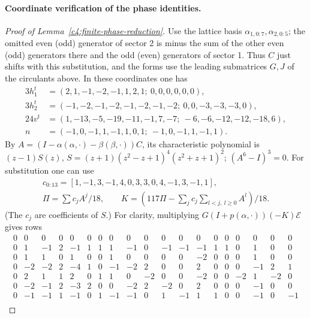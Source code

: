 \paragraph{Coordinate verification of the phase identities.}
\begin{proof}[Proof of Lemma~\ref{c4:finite-phase-reduction}]
Use the lattice basis \(\alpha_{1,0:7},\alpha_{2,0:5}\); the omitted even (odd) generator of sector 2 is minus the sum of the other even (odd) generators there and the odd (even) generators of sector 1. Thus \(C\) just shifts with this substitution, and the forms use the leading submatrices \(G,J\) of the circulants above. In these coordinates one has
\[
 \begin{split}
 3h_1^t&=(2,1,-1,-2,-1,1,2,1;\ 0,0,0,0,0,0),\\
 3h_2^t&=(-1,-2,-1,-2,-1,-2,-1,-2;\ 0,0,-3,-3,-3,0),\\
 24v^t&=(1,-13,-5,-19,-11,-1,7,-7;\ -6,-6,-12,-12,-18,6),\\
 n&=(-1,0,-1,1,-1,1,0,1;\ -1,0,-1,1,-1,1).
 \end{split}
\]
By \(A=(I-\alpha(\alpha,\cdot)-\beta(\beta,\cdot))C\), its characteristic polynomial is \((z-1)S(z)\), \(S=(z+1)(z^2-z+1)^4(z^2+z+1)^2\); \((A^6-I)^3=0\). For substitution one can use
\[
\begin{gathered}
 c_{0:13}=[1,-1,3,-1,4,0,3,3,0,4,-1,3,-1,1],\\
 \Pi=\sum c_j A^j/18,\qquad K=(117\Pi-\sum_j c_j\sum_{l<j,\ l\ge0}A^l)/18 .
\end{gathered}
\]
(The \(c_j\) are coefficients of \(S\).) For clarity, multiplying \(G(I+p(\alpha,\cdot))(-K)\mathscr E\) gives rows
\begingroup\setlength{\arraycolsep}{2pt}\scriptsize
\[\begin{array}{rrrrrrrrrrrrrrrrrrr}
0 & 0 & 0 & 0 & 0 & 0 & 0 & 0 & 0 & 0 & 0 & 0 & 0 & 0 & 0 & 0 & 0 & 0 & 0\\
0 & 1 & -1 & 2 & -1 & 1 & 1 & 1 & -1 & 0 & -1 & -1 & -1 & 1 & 1 & 0 & 1 & 0 & 0\\
0 & 1 & 1 & 0 & 1 & 0 & 0 & 1 & 0 & 0 & 0 & 0 & -2 & 0 & 0 & 0 & 1 & 0 & 0\\
0 & -2 & -2 & 2 & -4 & 1 & 0 & -1 & -2 & 2 & 0 & 0 & 2 & 0 & 0 & 0 & -1 & 2 & 1\\
0 & 2 & 1 & 1 & 2 & 0 & 1 & 1 & 0 & -2 & 0 & 0 & -2 & 0 & 0 & -2 & 1 & -2 & 0\\
0 & -2 & -1 & 2 & -3 & 2 & 0 & 0 & -2 & 2 & -2 & 0 & 2 & 0 & 0 & 0 & -1 & 0 & 0\\
0 & -1 & -1 & 1 & -1 & 0 & 1 & -1 & -1 & 0 & 1 & -1 & 1 & 1 & 0 & 0 & -1 & 0 & -1\\

\end{array}\]
\end{proof}
